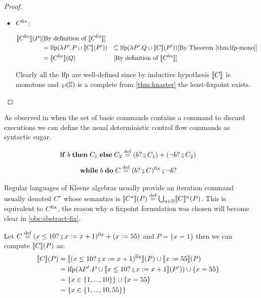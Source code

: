 \documentclass[
  10pt,       %
  twoside,    %
  a4paper,    %
  english,    %
  tikz,       %
  openright,  %
]{book}
\begin{document}
\begin{proof}
\begin{itemize}
    \item $C^{\mathrm{fix}}$:

      \begin{align*}
        \llbracket C^{\mathrm{fix}} \rrbracket(P) 
          &\text{[By definition of $\llbracket C^{\mathrm{fix}} \rrbracket$]}\\
          &= \mathrm{lfp}(\lambda P'. P \cup \llbracket C \rrbracket(P'))
          &\subseteq \mathrm{lfp}(\lambda P'. Q \cup \llbracket C \rrbracket(P'))
          &\text{[By Theorem \ref{thm:lfp-mono}]}\\
          &= \llbracket C^{\mathrm{fix}} \rrbracket(Q) 
          &\text{[By definition of $\llbracket C^{\mathrm{fix}} \rrbracket$]}\\
      \end{align*}
      
      Clearly all the $\mathrm{lfp}$ are well-defined since by inductive hypothesis
      $\llbracket C \rrbracket$ is monotone and $\wp(\mathbb{S})$ is a complete from 
      \ref{thm:knaster} the least-fixpoint exists.
  \end{itemize}

\end{proof}

\begin{observation}
  As observed in \cite{Fischer79} when the set of basic commands contains a 
  command to discard executions we can define the usual deterministic control 
  flow commands as syntactic sugar.

  $$\mathbf{if} \; b \; \mathbf{then} \; C_1 \; \mathbf{else} \; C_2 \defeq (b ? \fcmp C_1) 
  + (\neg b ? \fcmp C_2)$$
  $$\mathbf{while} \; b \; \mathbf{do} \; C \defeq (b? \fcmp C)^\fix \fcmp \neg b ?$$
\end{observation}

\begin{observation}
  Regular languages of Kleene algebras \cite{Kozen97} usually provide an
  iteration command usually denoted $C^\star$ whose semantics is
  $\llbracket C^\star \rrbracket(P) \stackrel{\text{def}}{=} \bigcup_{n \in \mathbb{N}} \llbracket C \rrbracket^n(P)$. This is
  equivalent to $C^{\mathrm{fix}}$, the reason why a fixpoint formulation was
  chosen will become clear in \ref{obs:abstract-fix}.
\end{observation}

\begin{example}
  Let $C \defeq (x \leq 10? \fcmp x := x + 1)^\fix + (x := 55)$ and 
  $P = \{ x = 1 \}$ then we can compute $\llbracket C \rrbracket(P)$ as:
  \begin{align*}
    \sem{C}(P)
      &= \sem{(x \leq 10? \fcmp x := x +1)^\fix}(P) \cup \sem{x := 55}(P) \\
      &= \lfp(\lambda P' . P \cup \sem{x \leq 10? \fcmp x := x + 1}(P'))
        \cup \{x = 55\} \\
      &= \{ x \in \{1, ..., 10\} \} \cup \{x = 55\} \\
      &= \{ x \in \{1, ..., 10, 55\} \}
  \end{align*}
\end{example}
\end{document}
